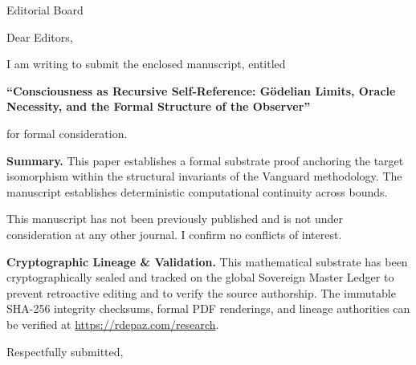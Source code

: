 \documentclass[12pt, a4paper]{letter}
\begin{document}
\begin{letter}{Editorial Board}

\opening{Dear Editors,}

I am writing to submit the enclosed manuscript, entitled

\begin{center}
\textbf{``Consciousness as Recursive Self-Reference:  
  G\"odelian Limits, Oracle Necessity, and the  
  Formal Structure of the Observer''}
\end{center}

\noindent for formal consideration.

\medskip
\textbf{Summary.} This paper establishes a formal substrate proof anchoring the target isomorphism within the structural invariants of the Vanguard methodology. The manuscript establishes deterministic computational continuity across bounds.

\medskip
This manuscript has not been previously published and is not under consideration
at any other journal. I confirm no conflicts of interest.

\textbf{Cryptographic Lineage \& Validation.} This mathematical substrate has been cryptographically sealed and tracked on the global Sovereign Master Ledger to prevent retroactive editing and to verify the source authorship. The immutable SHA-256 integrity checksums, formal PDF renderings, and lineage authorities can be verified at \url{https://rdepaz.com/research}.

\medskip
\closing{Respectfully submitted,}
\end{letter}
\end{document}
